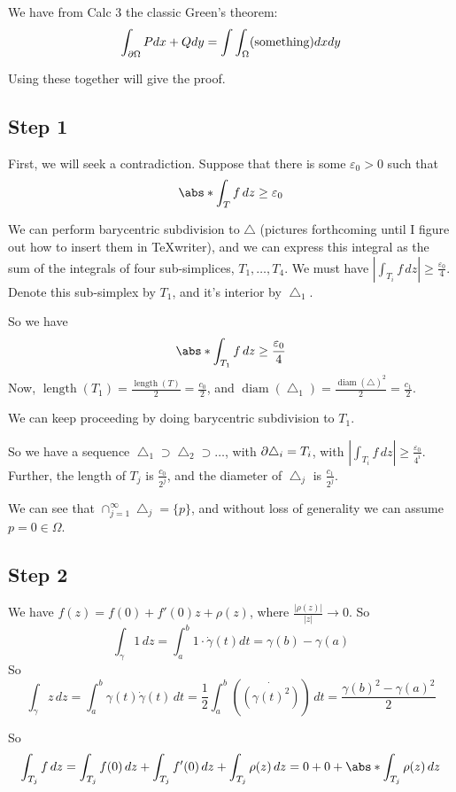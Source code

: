 \documentclass[x11names,reqno,14pt]{extarticle}
\newcommand{\oo}{{\infty}}
\newcommand{\bigt}{\bigtriangleup}
\begin{document}
We have from Calc 3 the classic Green's theorem: 
\[
\int_{\partial\Omega}Pdx + Qdy = \int\int_{\Omega}(\text{something})dxdy
\]

Using these together will give the proof. 

\subsection*{Step 1}

First, we will seek a contradiction. Suppose that there is some $\varepsilon_0>0$ such that 
\[
\abs*{\int_Tf\,dz}\geq\varepsilon_0
\]

We can perform barycentric subdivision to $\bigtriangleup$ (pictures forthcoming until I figure out how to insert them in TeXwriter), and we can express this integral as the sum of the integrals of four sub-simplices, $T_1,\dots,T_4$. We must have $|\int_{T_i}f\,dz|\geq \frac{\varepsilon_0}{4}$. Denote this sub-simplex by $T_1$, and it's interior by $\bigtriangleup_1$. 

So we have
\[
\abs*{\int_{T_1}f\,dz}\geq\frac{\varepsilon_0}{4}
\]
Now, $\operatorname{length}(T_1) = \frac{\operatorname{length}(T)}{2} = \frac{c_0}{2}$, and $\operatorname{diam}(\bigtriangleup_1) = \frac{\operatorname{diam}(\bigtriangleup)^2}{2} = \frac{c_1}{2}$.

We can keep proceeding by doing barycentric subdivision to $T_1$. 

So we have a sequence $\bigt_1 \supset \bigt_2 \supset \dots $, with $\del \bigt_i = T_i$, with $|\int_{T_i}f\,dz|\geq\frac{\varepsilon_0}{4^i}$. Further, the length of $T_j$ is $\frac{c_0}{2^j}$, and the diameter of $\bigt_j$ is $\frac{c_1}{2^j}$. 

We can see that $\cap_{j=1}^\oo\bigt_j = \{p\}$, and without loss of generality we can assume $p = 0 \in \Omega$. 

\subsection*{Step 2}

We have $f(z) = f(0) + f'(0)z + \rho(z)$, where $\frac{|\rho(z)|}{|z|}\to 0$. So
\[
\int_\gamma 1\,dz = \int_a^b1\cdot\dot{\gamma}(t)dt = \gamma(b) - \gamma(a)
\]
So
\[
\int_\gamma z\,dz = \int_a^b\gamma(t)\dot{\gamma}(t)\,dt = \frac{1}{2}\int_a^b(\dot{(\gamma(t)^2)})\,dt = \frac{\gamma(b)^2 - \gamma(a)^2}{2}
\]

So
\[
\int_{T_j}f\,dz = \int_{T_j}f(0)\,dz + \int_{T_j}f'(0)\,dz + \int_{T_j}\rho(z)\,dz = 0 + 0 + \abs*{\int_{T_j}\rho(z)\,dz}
\]
\end{document}
